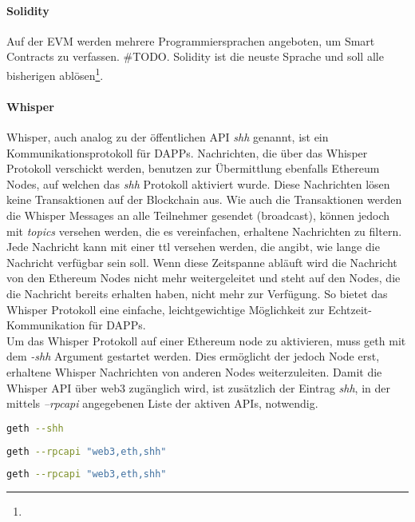 \paragraph{Solidity}
Auf der \acrfull{EVM} werden mehrere Programmiersprachen angeboten, um Smart Contracts zu verfassen. \#TODO. Solidity ist die neuste Sprache und soll alle bisherigen ablösen\footnote{}.
\paragraph{Whisper}
\label{para:Whisper}
Whisper, auch analog zu der öffentlichen API \emph{shh} genannt, ist ein Kommunikationsprotokoll für \acrfull{DAPPs}. Nachrichten, die über das Whisper Protokoll verschickt werden, benutzen zur Übermittlung ebenfalls Ethereum Nodes, auf welchen das \emph{shh} Protokoll aktiviert wurde. Diese Nachrichten lösen keine Transaktionen auf der Blockchain aus. Wie auch die Transaktionen werden die Whisper Messages an alle Teilnehmer gesendet (broadcast), können jedoch mit \emph{topics} versehen werden, die es vereinfachen, erhaltene Nachrichten zu filtern.  Jede Nachricht kann mit einer \acrfull{ttl} versehen werden, die angibt, wie lange die Nachricht verfügbar sein soll. Wenn diese Zeitspanne abläuft wird die Nachricht von den Ethereum Nodes nicht mehr weitergeleitet und steht auf den Nodes, die die Nachricht bereits erhalten haben, nicht mehr zur Verfügung. So bietet das Whisper Protokoll eine einfache, leichtgewichtige Möglichkeit zur Echtzeit-Kommunikation für \acrshort{DAPPs}.
\\Um das Whisper Protokoll auf einer Ethereum node zu aktivieren, muss geth mit dem \emph{-shh} Argument gestartet werden. Dies ermöglicht der jedoch Node erst, erhaltene Whisper Nachrichten von anderen Nodes weiterzuleiten. Damit die Whisper API über web3 zugänglich wird, ist zusätzlich der Eintrag \emph{shh}, in der mittels \emph{--rpcapi} angegebenen Liste der aktiven APIs, notwendig.
\begin{lstlisting}[language=bash,caption=Beispiel für die Aktivierung des shh Protokolls auf der Ethereum Node]
geth --shh
\end{lstlisting}
\begin{lstlisting}[language=bash,caption={Beispiel für die Aktivierung der web3, eth und shh API}]
geth --rpcapi "web3,eth,shh"
\end{lstlisting}
\begin{lstlisting}[language=bash,caption={Beispiel für die Aktivierung des shh Protokolls und der web3, eth und shh API}]
geth --rpcapi "web3,eth,shh"
\end{lstlisting}
